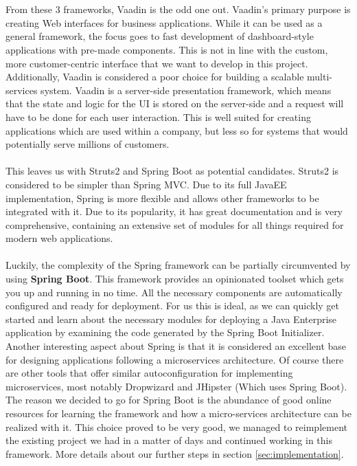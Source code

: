 \documentclass[12pt]{article}
\begin{document}
\begin{multicols}{2}
\\\\
From these 3 frameworks, Vaadin is the odd one out. Vaadin's primary purpose is creating Web interfaces for business applications. While it can be used as a general framework, the focus goes to fast development of dashboard-style applications with pre-made components. This is not in line with the custom, more customer-centric interface that we want to develop in this project. Additionally, Vaadin is considered a poor choice for building a scalable multi-services system. \cite{VaadinDisadvantages47:online} Vaadin is a server-side presentation framework, which means that the state and logic for the UI is stored on the server-side and a request will have to be done for each user interaction. This is well suited for creating applications which are used within a company, but less so for systems that would potentially serve millions of customers.
\\\\
This leaves us with Struts2 and Spring Boot as potential candidates. Struts2 is considered to be simpler than Spring MVC. Due to its full JavaEE implementation, Spring is more flexible and allows other frameworks to be integrated with it. Due to its popularity, it has great documentation and is very comprehensive, containing an extensive set of modules for all things required for modern web applications. \cite{StrutsVsSpring72:online} 
\\\\
Luckily, the complexity of the Spring framework can be partially circumvented by using \textbf{Spring Boot}. This framework provides an opinionated toolset which gets you up and running in no time. All the necessary components are automatically configured and ready for deployment. For us this is ideal, as we can quickly get started and learn about the necessary modules for deploying a Java Enterprise application by examining the code generated by the Spring Boot Initializer. Another interesting aspect about Spring is that it is considered an excellent base for designing applications following a microservices architecture. \cite{SpringMicroservices35:online} \cite{MicroservicesFrameworks85:online} Of course there are other tools that offer similar autoconfiguration for implementing microservices, most notably Dropwizard and JHipster (Which uses Spring Boot). The reason we decided to go for Spring Boot is the abundance of good online resources for learning the framework and how a micro-services architecture can be realized with it. This choice proved to be very good, we managed to reimplement the existing project we had in a matter of days and continued working in this framework. More details about our further steps in section \ref{sec:implementation}.


\end{multicols}
\end{document}
